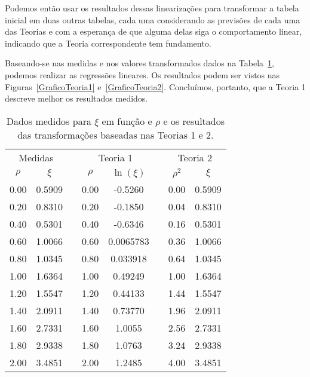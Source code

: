 Podemos então usar os resultados dessas linearizações para transformar a tabela inicial em duas outras tabelas, cada uma considerando as previsões de cada uma das Teorias e com a esperança de que alguma delas siga o comportamento linear, indicando que a Teoria correspondente tem fundamento.

Baseando-se nas medidas e nos valores transformados dados na Tabela~\ref{TabelaMedidas}, podemos realizar as regressões lineares. Os resultados podem ser vistos nas Figuras~\ref{GraficoTeoria1} e~\ref{GraficoTeoria2}. Concluímos, portanto, que a Teoria 1 descreve melhor os resultados medidos.


\begin{table}
\centering
\forcerectofloat
\caption{Dados medidos para $\xi$ em função e $\rho$ e os resultados das transformações baseadas nas Teorias 1 e 2.}
\label{TabelaMedidas}
\begin{tabular}{cccccccc}
\toprule
\multicolumn{2}{c}{Medidas} && \multicolumn{2}{c}{Teoria 1} && \multicolumn{2}{c}{Teoria 2} \\
\cmidrule(lr){1-2} \cmidrule(lr){4-5} \cmidrule(lr){7-8}
$\rho$ & $\xi$     && $\rho$  & $\ln(\xi)$    && $\rho^2$   & $\xi$ \\
\midrule
0.00    & 0.5909    &&  0.00    & -0.5260      &&   0.00     & 0.5909  \\ 
0.20    & 0.8310    &&  0.20    & -0.1850      &&   0.04     & 0.8310  \\
0.40    & 0.5301    &&  0.40    & -0.6346      &&   0.16     & 0.5301  \\
0.60    & 1.0066    &&  0.60    & 0.0065783    &&   0.36     & 1.0066  \\
0.80    & 1.0345    &&  0.80    & 0.033918     &&   0.64     & 1.0345  \\
1.00    & 1.6364    &&  1.00    & 0.49249      &&   1.00     & 1.6364  \\
1.20    & 1.5547    &&  1.20    & 0.44133      &&   1.44     & 1.5547  \\
1.40    & 2.0911    &&  1.40    & 0.73770      &&   1.96     & 2.0911  \\
1.60    & 2.7331    &&  1.60    & 1.0055       &&   2.56     & 2.7331  \\
1.80    & 2.9338    &&  1.80    & 1.0763       &&   3.24     & 2.9338  \\
2.00    & 3.4851    &&  2.00    & 1.2485       &&   4.00     & 3.4851  \\

\end{tabular}
\end{table}
